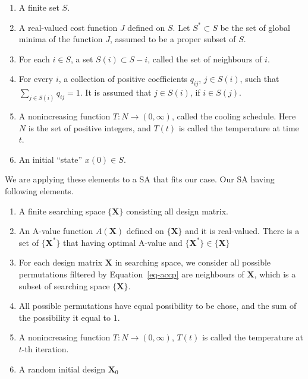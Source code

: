 \documentclass[
  a4paper,
  oneside,
  openany,
  12pt,
  onecolumn]{book}
\providecommand{\tightlist}{%
  \setlength{\itemsep}{0pt}\setlength{\parskip}{0pt}}\usepackage{longtable,booktabs,array}
\theoremstyle{plain}
\theoremstyle{definition}
\theoremstyle{remark}
\begin{document}
\begin{enumerate}
\def\labelenumi{\arabic{enumi}.}
\tightlist
\item
  A finite set \(S\).
\item
  A real-valued cost function \(J\) defined on \(S\). Let
  \(S^*\subset S\) be the set of global minima of the function \(J\),
  assumed to be a proper subset of \(S\).
\item
  For each \(i\in S\), a set \(S(i) \subset S - {i}\), called the set of
  neighbours of \(i\).
\item
  For every \(i\), a collection of positive coefficients \(q_{ij}\),
  \(j\in S(i)\), such that \(\sum_{j\in S(i)} q_{ij} = 1\). It is
  assumed that \(j\in S(i)\), if \(i \in S(j)\).
\item
  A nonincreasing function \(T:N\rightarrow (0, \infty)\), called the
  cooling schedule. Here \(N\) is the set of positive integers, and
  \(T(t)\) is called the temperature at time \(t\).
\item
  An initial ``state'' \(x(0)\in S\).
\end{enumerate}

We are applying these elements to a SA that fits our case. Our SA having
following elements.

\begin{enumerate}
\def\labelenumi{\arabic{enumi}.}
\tightlist
\item
  A finite searching space \(\{\boldsymbol{X}\}\) consisting all design
  matrix.
\item
  An A-value function \(A(\boldsymbol{X})\) defined on
  \(\{\boldsymbol{X}\}\) and it is real-valued. There is a set of
  \(\{\boldsymbol{X}^*\}\) that having optimal A-value and
  \(\{\boldsymbol{X}^*\}\in \{\boldsymbol{X}\}\)
\item
  For each design matrix \(\boldsymbol{X}\) in searching space, we
  consider all possible permutations filtered by Equation~\ref{eq-accp}
  are neighbours of \(\boldsymbol{X}\), which is a subset of searching
  space \(\{\boldsymbol{X}\}\).
\item
  All possible permutations have equal possibility to be chose, and the
  sum of the possibility it equal to \(1\).
\item
  A nonincreasing function \(T:N\rightarrow (0, \infty)\), \(T(t)\) is
  called the temperature at \(t\)-th iteration.
\item
  A random initial design \(\boldsymbol{X}_0\)
\end{enumerate}
\end{document}
